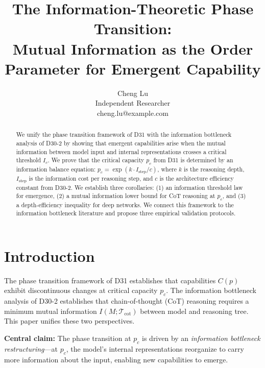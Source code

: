 \documentclass[12pt]{article}
\theoremstyle{definition}
\theoremstyle{remark}
\begin{document}
\title{The Information-Theoretic Phase Transition: \\ Mutual Information as the Order Parameter for Emergent Capability}

\author{Cheng Lu\\
Independent Researcher\\
cheng.lu@example.com}

\date{}

\maketitle

\begin{abstract}
We unify the phase transition framework of D31 with the information bottleneck analysis of D30-2 by showing that emergent capabilities arise when the mutual information between model input and internal representations crosses a critical threshold $I_c$. We prove that the critical capacity $p_c$ from D31 is determined by an information balance equation: $p_c = \exp(k \cdot I_{\mathrm{step}} / c)$, where $k$ is the reasoning depth, $I_{\mathrm{step}}$ is the information cost per reasoning step, and $c$ is the architecture efficiency constant from D30-2. We establish three corollaries: (1) an information threshold law for emergence, (2) a mutual information lower bound for CoT reasoning at $p_c$, and (3) a depth-efficiency inequality for deep networks. We connect this framework to the information bottleneck literature and propose three empirical validation protocols.
\end{abstract}

\section{Introduction}

The phase transition framework of D31 establishes that capabilities $C(p)$ exhibit discontinuous changes at critical capacity $p_c$. The information bottleneck analysis of D30-2 establishes that chain-of-thought (CoT) reasoning requires a minimum mutual information $I(M; \mathcal{T}_{\mathrm{cot}})$ between model and reasoning tree. This paper unifies these two perspectives.

\textbf{Central claim:} The phase transition at $p_c$ is driven by an \emph{information bottleneck restructuring}---at $p_c$, the model's internal representations reorganize to carry more information about the input, enabling new capabilities to emerge.
\end{document}
